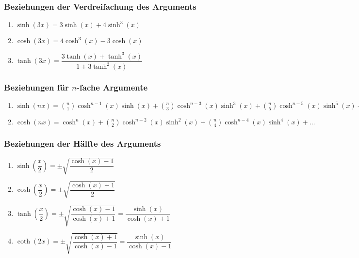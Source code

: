 \subsubsection{Beziehungen der Verdreifachung des Arguments}
\begin{enumerate}[$(a)$]
\item $\sinh\left(3x\right)=3\sinh\left(x\right)+4\sinh^3\left(x\right)$
\item $\cosh\left(3x\right)=4\cosh^3\left(x\right)-3\cosh\left(x\right)$
\item $\tanh\left(3x\right)=\dfrac{3\tanh\left(x\right)+\tanh^3\left(x\right)}{1+3\tanh^2\left(x\right)}$
\end{enumerate}
\subsubsection{Beziehungen für $n$-fache Argumente}
\begin{enumerate}[$(a)$]
\item $\sinh\left(nx\right)=\displaystyle \binom{n}{1}\cosh^{n-1}\left(x\right)\sinh\left(x\right)+\displaystyle \binom{n}{3}\cosh^{n-3}\left(x\right)\sinh^3\left(x\right)+\displaystyle \binom{n}{5}\cosh^{n-5}\left(x\right)\sinh^5\left(x\right)+\dotso$
\item $\cosh\left(nx\right)=\cosh^{n}\left(x\right)+\displaystyle \binom{n}{2}\cosh^{n-2}\left(x\right)\sinh^2\left(x\right)+\displaystyle \binom{n}{4}\cosh^{n-4}\left(x\right)\sinh^4\left(x\right)+\dotso$
\end{enumerate}
\subsubsection{Beziehungen der Hälfte des Arguments}
\begin{enumerate}[$(a)$]
\item $\sinh\left(\dfrac{x}{2}\right)=\pm\sqrt{\dfrac{\cosh\left(x\right)-1}{2}}$
\item $\cosh\left(\dfrac{x}{2}\right)=\pm\sqrt{\dfrac{\cosh\left(x\right)+1}{2}}$
\item $\tanh\left(\dfrac{x}{2}\right)=\pm\sqrt{\dfrac{\cosh\left(x\right)-1}{\cosh\left(x\right)+1}}=\dfrac{\sinh\left(x\right)}{\cosh\left(x\right)+1}$
\item $\coth\left(2x\right)=\pm\sqrt{\dfrac{\cosh\left(x\right)+1}{\cosh\left(x\right)-1}}=\dfrac{\sinh\left(x\right)}{\cosh\left(x\right)-1}$
\end{enumerate}

